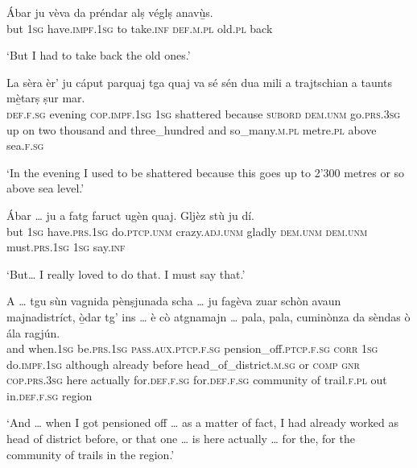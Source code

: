 \begin{linenumbers}
\gll Ábar ju vèva da préndar alṣ véglṣ anavù̱s.\footnotemark{}   \\
but \textsc{1sg} have.\textsc{impf.1sg} to take.\textsc{inf} \textsc{def.m.pl} old.\textsc{pl} back \\
\end{linenumbers}
\medskip
\glt `But I had to take back the old ones.'
\medskip

\begin{linenumbers}
\gll  La sèra èr’ ju cáput parquaj tga quaj va sé sén dua mili a trajtschian a taunts mè̱tarṣ ṣur mar. \\
 \textsc{def.f.sg} evening \textsc{cop.impf.1sg} \textsc{1sg} shattered because \textsc{subord} \textsc{dem.unm} go.\textsc{prs.3sg} up on two thousand and three\_hundred and  so\_many.\textsc{m.pl} metre.\textsc{pl} above sea.\textsc{f.sg}\\
\end{linenumbers}
\medskip
\glt `In the evening I used to be shattered because this goes up to 2'300 metres or so above sea level.'
\medskip

\begin{linenumbers}
\gll  Ábar … ju a fatg faruct ugèn quaj. Gljèz stù ju dí.  \\
but {} \textsc{1sg} have.\textsc{prs.1sg} do.\textsc{ptcp.unm} crazy.\textsc{adj.unm} gladly \textsc{dem.unm} \textsc{dem.unm} must.\textsc{prs.1sg} \textsc{1sg} say.\textsc{inf}\\ 
\end{linenumbers}
\medskip
\glt `But… I really loved to do that. I must say that.'
\medskip

\begin{linenumbers}
\gll  A … tgu sùn vagnida pènṣjunada scha … ju fagèva zuar schòn avaun majnadistríct, ò̱dar tg’ ins … è cò atgnamajn … pala, pala, cuminònza da sèndas ò ála ragjún.  \\
and {} when.\textsc{1sg} be.\textsc{prs.1sg} \textsc{pass.aux.ptcp.f.sg} pension\_off.\textsc{ptcp.f.sg} \textsc{corr} {} \textsc{1sg} do.\textsc{impf.1sg} although already before head\_of\_district.\textsc{m.sg} or \textsc{comp} \textsc{gnr} {} \textsc{cop.prs.3sg} here actually {} for.\textsc{def.f.sg} for.\textsc{def.f.sg} community of trail.\textsc{f.pl} out in.\textsc{def.f.sg} region\\
\end{linenumbers}
\medskip
\glt `And … when I got pensioned off … as a matter of fact, I had already worked as head of district before, or that one … is here actually … for the, for the community of trails in the region.'
\medskip
 
